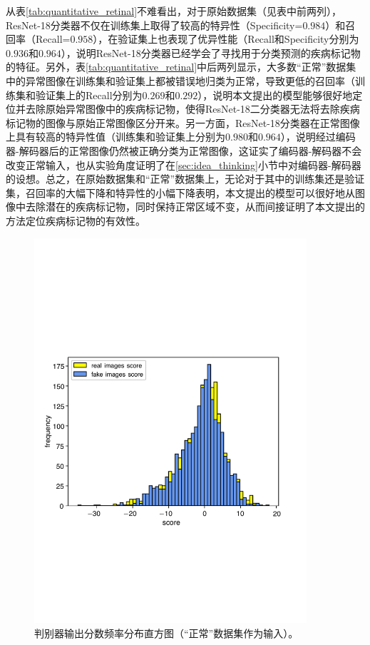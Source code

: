 从表\ref{tab:quantitative_retinal}不难看出，对于原始数据集（见表中前两列），ResNet-18分类器不仅在训练集上取得了较高的特异性（Specificity=$0.984$）和召回率（Recall=$0.958$），在验证集上也表现了优异性能（Recall和Specificity分别为$0.936$和$0.964$），说明ResNet-18分类器已经学会了寻找用于分类预测的疾病标记物的特征。另外，表\ref{tab:quantitative_retinal}中后两列显示，大多数“正常”数据集中的异常图像在训练集和验证集上都被错误地归类为正常，导致更低的召回率（训练集和验证集上的Recall分别为$0.269$和$0.292$），说明本文提出的模型能够很好地定位并去除原始异常图像中的疾病标记物，使得ResNet-18二分类器无法将去除疾病标记物的图像与原始正常图像区分开来。另一方面，ResNet-18分类器在正常图像上具有较高的特异性值（训练集和验证集上分别为$0.980$和$0.964$），说明经过编码器-解码器后的正常图像仍然被正确分类为正常图像，这证实了编码器-解码器不会改变正常输入，也从实验角度证明了在\ref{sec:idea_thinking}小节中对编码器-解码器的设想。总之，在原始数据集和“正常”数据集上，无论对于其中的训练集还是验证集，召回率的大幅下降和特异性的小幅下降表明，本文提出的模型可以很好地从图像中去除潜在的疾病标记物，同时保持正常区域不变，从而间接证明了本文提出的方法定位疾病标记物的有效性。
\begin{figure}[h]
	\centering
	\includegraphics[width=0.9\textwidth]{figure/score_distribution}
	\caption[判别器输出分数频率分布直方图（“正常”数据集作为输入）]{判别器输出分数频率分布直方图（“正常”数据集作为输入）。}
	\label{fig:hist_freq}
\end{figure}

